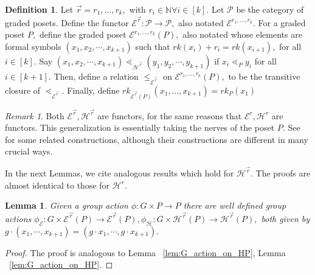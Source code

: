 \documentclass[10 pt]{amsart}
\theoremstyle{plain}
\newtheorem{lem}[thm]{Lemma}
\theoremstyle{definition}
\newtheorem{defn}[thm]{Definition}
\theoremstyle{remark}
\newtheorem{rem}[thm]{Remark}
\numberwithin{equation}{section}
\newcommand\BN{{\mathbb N}}
\renewcommand{\vec}[1]{\overrightarrow{#1}}
\begin{document}
\begin{defn}
Let $\vec r = r_1,\ldots,r_k,$ with $r_i \in \BN\forall i \in [k].$ Let $\mathcal P$ be the category of graded posets. Define the functor $\mathcal E^{\vec r}:\mathcal P \rightarrow \mathcal P,$ also notated $\mathcal E^{r_1,\ldots, r_k}.$ For a graded poset $P,$ define the graded poset $\mathcal E^{r_1,\ldots, r_k}(P),$ also notated whose elements are formal symbols $(x_1, x_2, \cdots, x_{k+1})$ such that $rk(x_i)+r_i = rk(x_{i+1}),$ for all $i \in [k].$ Say 
$(x_1, x_2, \cdots, x_{k+1})\lessdot_{\mathcal H^{\vec r}} (y_1, y_2, \cdots , y_{k+1})$ if $x_i \lessdot_P y_i$ for all $i \in [k+1]$. Then, define a relation $\leq_{\mathcal E^{\vec r}}$ on $\mathcal E^{r_1,\ldots, r_k}(P),$ to be the transitive closure of $\lessdot_{\mathcal E^{\vec r}}.$ Finally, define $rk_{\mathcal E^{\vec r}(P)}(x_1,\ldots, x_{k+1}) = rk_P(x_1)$
\end{defn}

\begin{rem}
Both $\mathcal E^{\vec r},\mathcal H^{\vec r}$ are functors, for the same reasons that $\mathcal E^r, \mathcal H^r$ are functors. This generalization is essentially taking the nerves of the poset $P.$ See \cite{babson} for some related constructions, although their constructions are different in many crucial ways.
\end{rem}

In the next Lemmas, we cite analogous results which hold for $\mathcal H^{\vec r}.$ The proofs are almost identical to those for $\mathcal H^r.$

\begin{lem}
Given a group action $\phi:G \times P \rightarrow P$ there are well defined group actions $\phi_{\mathcal E}:G\times \mathcal E^{\vec r}(P) \rightarrow \mathcal E^{\vec r}(P),\phi_{\mathcal H}:G\times \mathcal H^{\vec r}(P) \rightarrow \mathcal H^{\vec r}(P),$ 
both given by $g \cdot (x_1, \cdots, x_{k+1}) =(g\cdot x_1, \cdots, g \cdot x_{k+1}).$
\end{lem}
\begin{proof}
The proof is analogous to Lemma ~\ref{lem:G_action_on_HP}, Lemma ~\ref{lem:G_action_on_HP}.
\end{proof}
\end{document}
